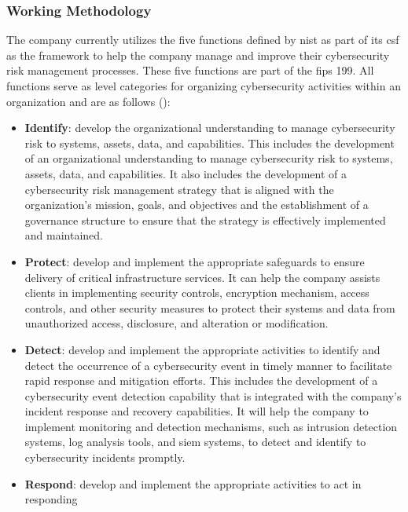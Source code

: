 \subsubsection{Working Methodology}
The company currently utilizes the five functions defined by \acrshort{nist} as part of its \acrshort{csf} as
the framework to help the company manage and improve their cybersecurity risk management processes. These five
functions are part of the \acrshort{fips} 199. All functions serve as level categories for organizing
cybersecurity activities within an organization and are as follows (\cite{nist}):
\begin{itemize}
      \item \textbf{Identify}: develop the organizational understanding to manage cybersecurity risk to
            systems, assets, data, and capabilities. This includes the development of an organizational
            understanding to manage cybersecurity risk to systems, assets, data, and capabilities. It also
            includes the development of a cybersecurity risk management strategy that is aligned with the
            organization's mission, goals, and objectives and the establishment of a governance structure to
            ensure that the strategy is effectively implemented and maintained.
      \item \textbf{Protect}: develop and implement the appropriate safeguards to ensure delivery of critical
            infrastructure services. It can help the company assists clients in implementing security controls,
            encryption mechanism, access controls, and other security measures to protect their systems and
            data from unauthorized access, disclosure, and alteration or modification.
      \item \textbf{Detect}: develop and implement the appropriate activities to identify and detect the
            occurrence of a cybersecurity event in timely manner to facilitate rapid response and mitigation
            efforts. This includes the development of a cybersecurity event detection capability that is
            integrated with the company's incident response and recovery capabilities. It will help the
            company to implement monitoring and detection mechanisms, such as intrusion detection systems,
            log analysis tools, and \acrshort{siem} systems, to detect and identify to cybersecurity incidents
            promptly.
      \item \textbf{Respond}: develop and implement the appropriate activities to act in responding

\end{itemize}
